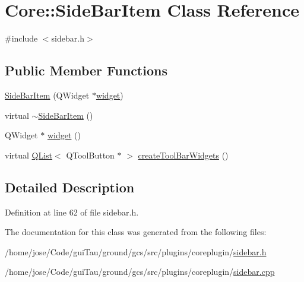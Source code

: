 \hypertarget{class_core_1_1_side_bar_item}{\section{Core\-:\-:Side\-Bar\-Item Class Reference}
\label{class_core_1_1_side_bar_item}
}


{\ttfamily \#include $<$sidebar.\-h$>$}

\subsection*{Public Member Functions}
\begin{DoxyCompactItemize}
\item 
\hyperlink{group___core_plugin_gabbb879ec14e6c2c6f45fe5470fc929fe}{Side\-Bar\-Item} (Q\-Widget $\ast$\hyperlink{group___core_plugin_ga59d9464feca7cdf98a15e9a5482cc858}{widget})
\item 
virtual \hyperlink{group___core_plugin_gae800a56747cc004c25c2b6a9e3b52efd}{$\sim$\-Side\-Bar\-Item} ()
\item 
Q\-Widget $\ast$ \hyperlink{group___core_plugin_ga59d9464feca7cdf98a15e9a5482cc858}{widget} ()
\item 
virtual \hyperlink{class_q_list}{Q\-List}$<$ Q\-Tool\-Button $\ast$ $>$ \hyperlink{group___core_plugin_ga3bafb40a4a749f25a811178bd3dcb7d8}{create\-Tool\-Bar\-Widgets} ()
\end{DoxyCompactItemize}


\subsection{Detailed Description}


Definition at line 62 of file sidebar.\-h.



The documentation for this class was generated from the following files\-:\begin{DoxyCompactItemize}
\item 
/home/jose/\-Code/gui\-Tau/ground/gcs/src/plugins/coreplugin/\hyperlink{sidebar_8h}{sidebar.\-h}\item 
/home/jose/\-Code/gui\-Tau/ground/gcs/src/plugins/coreplugin/\hyperlink{sidebar_8cpp}{sidebar.\-cpp}\end{DoxyCompactItemize}
